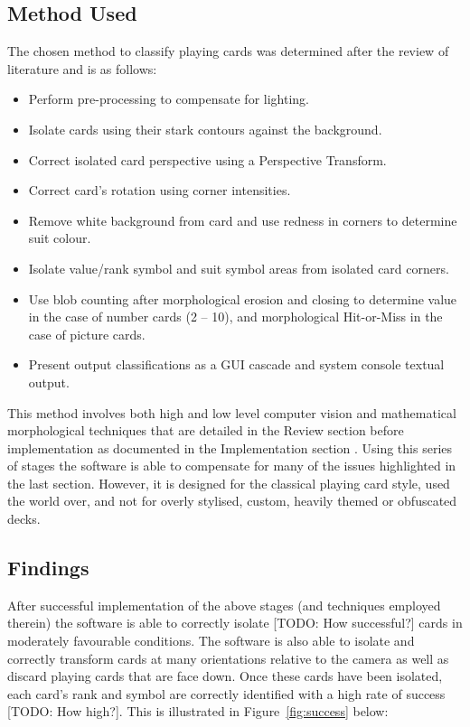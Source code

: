 	\subsection{Method Used}
		The chosen method to classify playing cards was determined after the review of literature and is as follows:
		\begin{itemize}
			\item Perform pre-processing to compensate for lighting.
			\item Isolate cards using their stark contours against the background.
			\item Correct isolated card perspective using a Perspective Transform.
			\item Correct card's rotation using corner intensities.
			\item Remove white background from card and use redness in corners to determine suit colour.
			\item Isolate value/rank symbol and suit symbol areas from isolated card corners.
			\item Use blob counting after morphological erosion and closing to determine value in the case of number cards (2 -- 10), and morphological Hit-or-Miss in the case of picture cards.
			\item Present output classifications as a GUI cascade and system console textual output.
		\end{itemize}

		This method involves both high and low level computer vision and mathematical morphological techniques that are detailed in the Review section  before implementation as documented in the Implementation section . Using this series of stages the software is able to compensate for many of the issues highlighted in the last section. However, it is designed for the classical playing card style, used the world over, and not for overly stylised, custom, heavily themed or obfuscated decks.
	\subsection{Findings}
		After successful implementation of the above stages (and techniques employed therein) the software is able to correctly isolate [TODO: How successful?] cards in moderately favourable conditions. The software is also able to isolate and correctly transform cards at many orientations relative to the camera as well as discard playing cards that are face down. Once these cards have been isolated, each card's rank and symbol are correctly identified with a high rate of success [TODO: How high?]. This is illustrated in Figure~\ref{fig:success} below:

